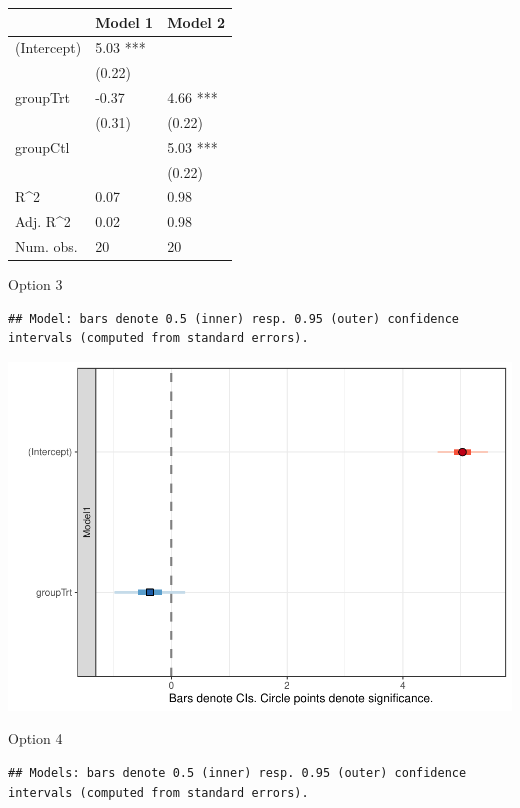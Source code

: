 \documentclass[
  man]{apa6}
\begin{document}
\begin{tabular}{l|l|l}
\hline
 & Model 1 & Model 2\\
\hline
(Intercept) & 5.03 *** & \\
\hline
 & (0.22) & \\
\hline
groupTrt & -0.37 & 4.66 ***\\
\hline
 & (0.31) & (0.22)\\
\hline
groupCtl &  & 5.03 ***\\
\hline
 &  & (0.22)\\
\hline
R\textasciicircum{}2 & 0.07 & 0.98\\
\hline
Adj. R\textasciicircum{}2 & 0.02 & 0.98\\
\hline
Num. obs. & 20 & 20\\
\hline
\end{tabular}

Option 3

\begin{verbatim}
## Model: bars denote 0.5 (inner) resp. 0.95 (outer) confidence intervals (computed from standard errors).
\end{verbatim}

\includegraphics{SNA4DSprojectReport_files/figure-latex/model 3-1.pdf}

Option 4

\begin{verbatim}
## Models: bars denote 0.5 (inner) resp. 0.95 (outer) confidence intervals (computed from standard errors).
\end{verbatim}
\end{document}
